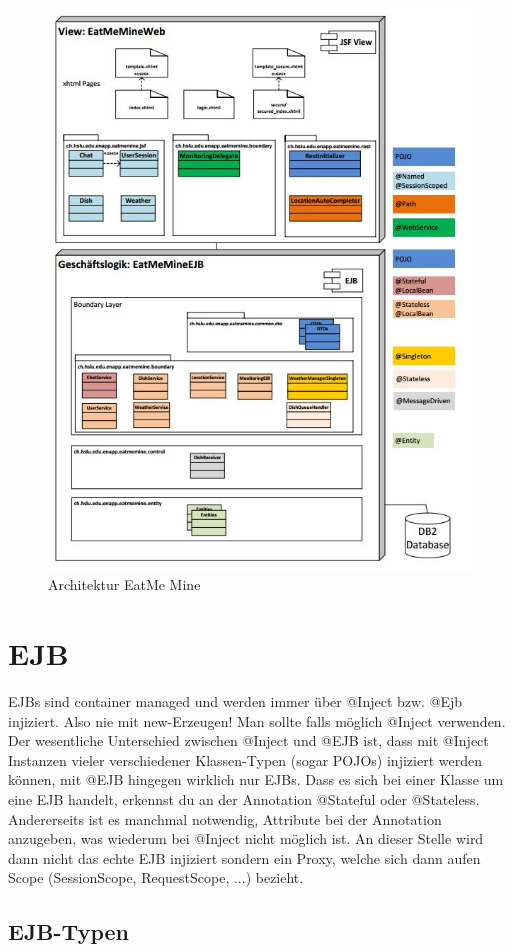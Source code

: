 \begin{figure}[h!]
\centering
\includegraphics[width=0.7\linewidth]{fig/tooling-architektur-eatmemine}
\caption{Architektur EatMe Mine}
\label{fig:tooling-architektur-eatmemine}
\end{figure}


\section{EJB}
EJBs sind container managed und werden immer über @Inject bzw. @Ejb injiziert. Also nie mit new-Erzeugen! Man sollte falls möglich @Inject verwenden. Der wesentliche Unterschied zwischen @Inject und @EJB ist, dass mit @Inject Instanzen vieler verschiedener Klassen-Typen (sogar POJOs) injiziert werden können, mit @EJB hingegen wirklich nur EJBs. Dass es sich bei einer Klasse um eine EJB handelt, erkennst du an der Annotation @Stateful oder @Stateless. Andererseits ist es manchmal notwendig, Attribute bei der Annotation anzugeben, was wiederum bei @Inject nicht möglich ist. An dieser Stelle wird dann nicht das echte EJB injiziert sondern ein Proxy, welche sich dann aufen Scope (SessionScope, RequestScope, ...) bezieht.

\subsection{EJB-Typen}

